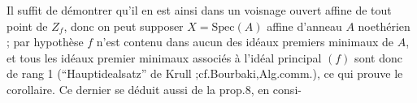 Il suffit de démontrer qu'il en est ainsi dans un voisnage ouvert affine de tout point de $Z_f$, donc on peut supposer  $X=\mathrm{Spec}(A)$ affine d'anneau $A$ noethérien ; par hypothèse $f$ n'est  contenu dans aucun des idéaux premiers minimaux de $A$, et tous les idéaux premier minimaux associés à l'idéal principal $(f)$ sont donc de rang 1 (``Hauptidealsatz'' de Krull ;cf.Bourbaki,Alg.comm.\qquad), ce qui prouve le corollaire. Ce dernier se déduit aussi de la prop.8, en  consi-
